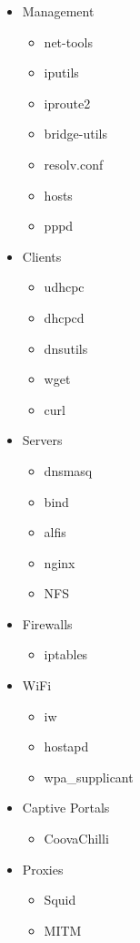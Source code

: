 \begin{itemize}
        \item Management
        \begin{itemize}
            \item net-tools
            \item iputils
            \item iproute2
            \item bridge-utils
            \item resolv.conf
            \item hosts
            \item pppd
        \end{itemize}

        \item Clients
        \begin{itemize}
            \item udhcpc
            \item dhcpcd
            \item dnsutils
            \item wget
            \item curl
        \end{itemize}

        \item Servers
        \begin{itemize}
            \item dnsmasq
            \item bind
            \item alfis
            \item nginx
            \item NFS
        \end{itemize}

        \item Firewalls
        \begin{itemize}
            \item iptables
        \end{itemize}

        \item WiFi
        \begin{itemize}
            \item iw
            \item hostapd
            \item wpa\_supplicant
        \end{itemize}

        \item Captive Portals
        \begin{itemize}
            \item CoovaChilli
        \end{itemize}

        \item Proxies
        \begin{itemize}
            \item Squid
            \item MITM
        \end{itemize}
\end{itemize}

